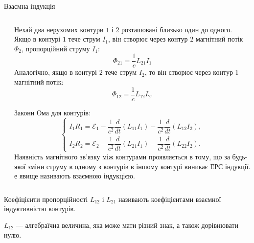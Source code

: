 \documentclass[onlytextwidth]{beamer}
\begin{document}
\begin{frame}{Взаємна індукція}{}
	\begin{columns}
		\begin{column}{0.4\linewidth}\centering
			
		\end{column}
		\begin{column}{0.6\linewidth}
			\begin{overprint}
				\begin{block}{}\justifying
					Нехай два нерухомих контури $1$ і $2$ розташовані близько один до одного. Якщо в контурі $1$ тече струм $I_1$, він створює через контур
					$2$ магнітний потік $\Phi_2$, пропорційний струму $I_1$:
					\begin{equation*}
						\Phi_{21} = \frac1c L_{21}I_1
					\end{equation*}
					Аналогічно, якщо в контурі $2$ тече струм $I_2$, то він створює через контур $1$ магнітний потік:
					\begin{equation*}
						\Phi_{12} = \frac1c L_{12}I_2.
					\end{equation*}
				\end{block}
				\begin{block}{}\justifying
					Закони Ома для контурів:
					\begin{equation*}
						\begin{cases}
							I_1R_1 = \mathcal{E}_1 - \dfrac1{c^2}\dfrac{d}{dt}\left( L_{11} I_1\right) - \dfrac1{c^2}\dfrac{d}{dt}\left( L_{12} I_2\right),
							\\[1,5ex]
							I_2R_2 = \mathcal{E}_2 - \dfrac1{c^2}\dfrac{d}{dt}\left( L_{21} I_1\right) - \dfrac1{c^2}\dfrac{d}{dt}\left( L_{22} I_2\right).
						\end{cases}
					\end{equation*}
					Наявність магнітного зв'язку між контурами проявляється в тому, що за будь-якої зміни струму в одному з контурів в іншому контурі виникає
					ЕРС індукції. е явище називають \alert{взаємною індукцією}.
				\end{block}
			\end{overprint}
		\end{column}
	\end{columns}
	\begin{overprint}
		\onslide<1>
		\begin{block}{}\justifying
			Коефіцієнти пропорційності $L_{12}$ і $L_{21}$ називають \alert{коефіцієнтами взаємної індуктивністю} контурів.
		\end{block}
		\onslide<2>
		\begin{block}{}\justifying
			$L_{12}$ --- алгебраїчна величина, яка може мати різний знак, а також дорівнювати нулю.
		\end{block}
	\end{overprint}
\end{frame}
\end{document}
